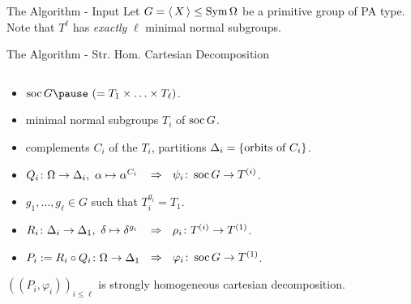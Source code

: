 \begin{frame}{The Algorithm - Input}
    \centering
    \large
    Let $G =  \left\langle \, X \, \right\rangle  \leq \operatorname{Sym} \Omega$ be a primitive group of PA type.
    \\[1em]
    \pause
    Note that $T ^ \ell$ has \emph{exactly} $\ell$ minimal normal subgroups.
\end{frame}


\begin{frame}{The Algorithm - Str. Hom. Cartesian Decomposition}
    \begin{alg}
        $~$
        \\[-1em]
        \begin{itemize}
            \item
            $\soc G \pause ~ (= T_1 \times \ldots \times T_\ell)$.
            \pause
            \item
            minimal normal subgroups $T_i$ of $\operatorname{soc} G$.
            \pause
            \item
            complements $C_i$ of the $T_i$,
            \pause
            partitions $\Delta_i =  \left\{  \text{orbits of } C_i  \right\} $.
            \pause
            \item
            $Q_i \colon \Omega \rightarrow \Delta_i,
            ~ \alpha \mapsto \alpha ^ {C_i}$
            \pause
            $~~\Rightarrow~~ \psi_i \colon \operatorname{soc} G \rightarrow T^{(i)}$.
            \pause
            \item
            $g_1, \ldots, g_\ell \in G$ such that $T_i ^ {g_i} = T_1$.
            \pause
            \item
            $R_i \colon \Delta_i \rightarrow \Delta_1,
            ~ \delta \mapsto \delta ^ {g_i}$
            \pause
            $~~\Rightarrow~~ \rho_i \colon T^{(i)} \rightarrow T ^ {(1)}$.
            \pause
            \item
            $P_i := R_i \circ Q_i \colon \Omega \rightarrow \Delta_1$
            \pause
            $\hspace{0.5em}\Rightarrow~~ \varphi_i \colon \operatorname{soc} G \rightarrow T ^ {(1)}$.
        \end{itemize}
    \end{alg}
    \pause

    $((P_i, \varphi_i))_{i \leq \ell}$
    is strongly homogeneous cartesian decomposition.
\end{frame}

